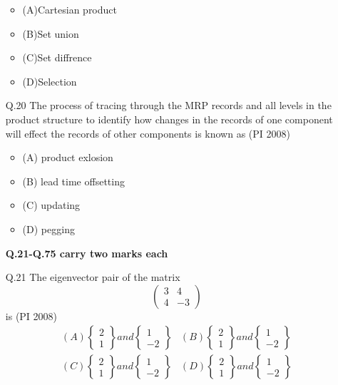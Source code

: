 \documentclass[journal,12pt,onecolumn]{IEEEtran}
\theoremstyle{remark}
\begin{document}
\begin{enumerate}
\begin{itemize}[label={}]
        \item (A)Cartesian product            \item (B)Set union 
        \item (C)Set diffrence                \item (D)Selection 
    \end{itemize}
\vspace{1cm}
\item[\textnormal{Q.20}] The process of tracing through the MRP records and all levels in the product structure to identify how changes in the records of one component will effect the records of other components is known as
    \hfill{(PI 2008)}\\
    \begin{itemize}[label={}]
        \item (A) product exlosion
        \item (B) lead time offsetting
        \item (C) updating
        \item (D) pegging
    \end{itemize}
\vspace{1cm}
\textbf{Q.21-Q.75 carry two marks each}
\vspace{1cm}
\item[\textnormal{Q.21}] The eigenvector pair of the matrix
\[\begin{pmatrix} 
3 & 4 \\
4 & -3
\end{pmatrix}\] is
    \hfill{(PI 2008)}\\
    \[\begin{matrix}
   { (A) \begin{Bmatrix} 2 \\ 1
    \end{Bmatrix}  and \begin{Bmatrix} 1 \\-2
    \end{Bmatrix}} & {(B) \begin{Bmatrix} 2 \\ 1
    \end{Bmatrix} and \begin{Bmatrix} 1 \\-2
    \end{Bmatrix}}\\
    { (C) \begin{Bmatrix} 2 \\ 1
    \end{Bmatrix}  and \begin{Bmatrix} 1 \\-2
    \end{Bmatrix}} & {(D) \begin{Bmatrix} 2 \\ 1
    \end{Bmatrix} and \begin{Bmatrix} 1 \\-2
    \end{Bmatrix}}
    

\end{matrix}\]
\end{enumerate}
\end{document}
